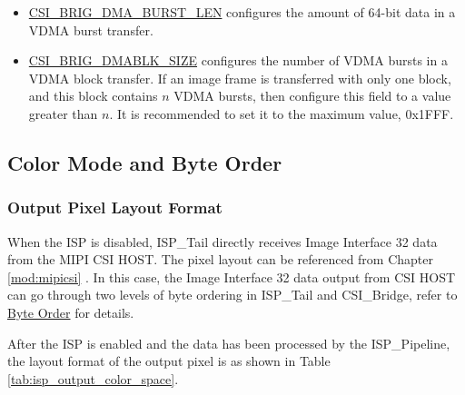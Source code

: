 \documentclass[main\_\_EN.tex]{subfiles}
\begin{document}
\begin{itemize}
    \item \hyperref[fielddesc:CSIBRIGDMABURSTLEN]{CSI\_BRIG\_DMA\_BURST\_LEN} configures the amount of 64-bit data in a VDMA burst transfer.
    \item \hyperref[fielddesc:CSIBRIGDMABLKSIZE]{CSI\_BRIG\_DMABLK\_SIZE} configures the number of VDMA bursts in a VDMA block transfer. If an image frame is transferred with only one block, and this block contains $n$ VDMA bursts, then configure this field to a value greater than $n$. It is recommended to set it to the maximum value, 0x1FFF.
\end{itemize}


\subsection{Color Mode and Byte Order}
\subsubsection{Output Pixel Layout Format}

When the ISP is disabled, ISP\_Tail directly receives Image Interface 32 data from the MIPI CSI HOST. The pixel layout can be referenced from Chapter \ref{mod:mipicsi} \textit{}. In this case, the Image Interface 32 data output from CSI HOST can go through two levels of byte ordering in ISP\_Tail and CSI\_Bridge, refer to \hyperref[sec:isp_byte_order]{Byte Order} for details.

After the ISP is enabled and the data has been processed by the ISP\_Pipeline, the layout format of the output pixel is as shown in Table \ref{tab:isp_output_color_space}.
\end{document}
